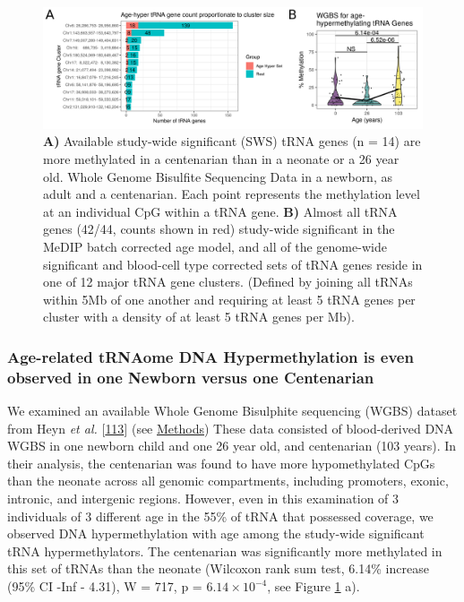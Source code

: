 \documentclass[
]{book}
\begin{document}
\begin{figure}

{\centering \includegraphics[width=0.95\linewidth]{./figs/heyn-cluster} 

}

\caption{\textbf{A)} Available study-wide significant (SWS) tRNA genes (n = 14) are more methylated in a centenarian than in a neonate or a 26 year old. Whole Genome Bisulfite Sequencing Data in a newborn, as adult and a centenarian. Each point represents the methylation level at an individual CpG within a tRNA gene. \textbf{B)} Almost all tRNA genes (42/44, counts shown in red) study-wide significant in the MeDIP batch corrected age model, and all of the genome-wide significant and blood-cell type corrected sets of tRNA genes reside in one of 12 major tRNA gene clusters. (Defined by joining all tRNAs within 5Mb of one another and requiring at least 5 tRNA genes per cluster with a density of at least 5 tRNA genes per Mb).}\label{fig:heyn}
\end{figure}



\hypertarget{age-related-trnaome-dna-hypermethylation-is-even-observed-in-one-newborn-versus-one-centenarian}{%
\subsubsection{Age-related tRNAome DNA Hypermethylation is even observed in one Newborn versus one Centenarian}\label{age-related-trnaome-dna-hypermethylation-is-even-observed-in-one-newborn-versus-one-centenarian}}

We examined an available Whole Genome Bisulphite sequencing (WGBS) dataset from Heyn \emph{et al.} {[}\protect\hyperlink{ref-Heyn2012}{113}{]} (see \protect\hyperlink{Methods}{Methods})
These data consisted of blood-derived DNA WGBS in one newborn child and one 26 year old, and centenarian (103 years).
In their analysis, the centenarian was found to have more hypomethylated CpGs than the neonate across all genomic compartments, including promoters, exonic, intronic, and intergenic regions.
However, even in this examination of 3 individuals of 3 different age in the 55\% of tRNA that possessed coverage, we observed DNA hypermethylation with age among the study-wide significant tRNA hypermethylators. The centenarian was significantly more methylated in this set of tRNAs than the neonate (Wilcoxon rank sum test, 6.14\% increase (95\% CI -Inf - 4.31), W = 717, p = \(6.14\times10^{-4}\), see Figure \ref{fig:heyn} a).
\end{document}
